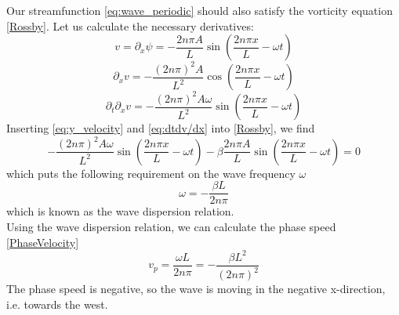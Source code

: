 \documentclass[12pt]{article}
\numberwithin{figure}{section}
\numberwithin{table}{section}
\begin{document}
\noindent Our streamfunction \eqref{eq:wave_periodic} should also satisfy the vorticity equation \eqref{Rossby}.  Let us calculate the necessary derivatives:
\begin{equation}
\label{eq:y_velocity}
v=\partial_x\psi=-\frac{2n\pi A}{L}\sin\left(\frac{2n\pi x}{L}-\omega t\right)
\end{equation}
\begin{equation}
\label{eq:dv/dx}
\partial_x v = -\frac{(2n\pi)^2A}{L^2}\cos\left(\frac{2n\pi x}{L}-\omega t\right)
\end{equation}
\begin{equation}
\label{eq:dtdv/dx}
\partial_t \partial_x v = -\frac{(2n\pi)^2A\omega}{L^2}\sin\left(\frac{2n\pi x}{L}-\omega t\right)
\end{equation}
Inserting \ref{eq:y_velocity} and \eqref{eq:dtdv/dx} into \eqref{Rossby}, we find
\begin{equation}
 -\frac{(2n\pi)^2A\omega}{L^2}\sin\left(\frac{2n\pi x}{L}-\omega t\right)-\beta\frac{2n\pi A}{L}\sin\left(\frac{2n\pi x}{L}-\omega t\right)=0 
\end{equation}
which puts the following requirement on the wave frequency $\omega$
\begin{equation}
\label{eq:omega_periodic}
\omega = -\frac{\beta L}{2n\pi}
\end{equation}
which is known as the wave dispersion relation.\\
\noindent Using the wave dispersion relation, we can calculate the phase speed \eqref{PhaseVelocity} 
\begin{equation}
\label{eq:phase_speed_periodic}
v_p = \frac{\omega L}{2n\pi} = -\frac{\beta L^2}{(2n\pi)^2}
\end{equation}
The phase speed is negative, so the wave is moving in the negative x-direction, i.e. towards the west.\\

\end{document}
